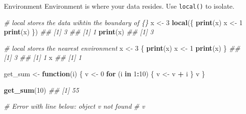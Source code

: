 \documentclass[
  10pt,
  ignorenonframetext,
  serif]{beamer}
\newenvironment{Shaded}{\begin{snugshade}}{\end{snugshade}}
\newcommand{\CommentTok}[1]{\textcolor[rgb]{0.56,0.35,0.01}{\textit{#1}}}
\newcommand{\ControlFlowTok}[1]{\textcolor[rgb]{0.13,0.29,0.53}{\textbf{#1}}}
\newcommand{\DecValTok}[1]{\textcolor[rgb]{0.00,0.00,0.81}{#1}}
\newcommand{\KeywordTok}[1]{\textcolor[rgb]{0.13,0.29,0.53}{\textbf{#1}}}
\newcommand{\NormalTok}[1]{#1}
\newcommand{\OperatorTok}[1]{\textcolor[rgb]{0.81,0.36,0.00}{\textbf{#1}}}
\newcommand{\StringTok}[1]{\textcolor[rgb]{0.31,0.60,0.02}{#1}}
\begin{document}
\begin{frame}[fragile]{Environment}
\protect\hypertarget{environment}{}
Environment is where your data resides. Use \texttt{local()} to isolate.

\begin{Shaded}
\begin{Highlighting}[]
\CommentTok{\# local stores the data wihtin the boundary of \{\}}
\NormalTok{x \textless{}{-}}\StringTok{ }\DecValTok{3}
\KeywordTok{local}\NormalTok{(\{}
  \KeywordTok{print}\NormalTok{(x)}
\NormalTok{  x \textless{}{-}}\StringTok{ }\DecValTok{1}
  \KeywordTok{print}\NormalTok{(x)}
\NormalTok{\})}
\CommentTok{\#\# [1] 3}
\CommentTok{\#\# [1] 1}
\KeywordTok{print}\NormalTok{(x)}
\CommentTok{\#\# [1] 3}
\end{Highlighting}
\end{Shaded}

\begin{Shaded}
\begin{Highlighting}[]
\CommentTok{\# local stores the nearest environment}
\NormalTok{x \textless{}{-}}\StringTok{ }\DecValTok{3}
\NormalTok{\{}
  \KeywordTok{print}\NormalTok{(x)}
\NormalTok{  x \textless{}{-}}\StringTok{ }\DecValTok{1}
  \KeywordTok{print}\NormalTok{(x)}
\NormalTok{\}}
\CommentTok{\#\# [1] 3}
\CommentTok{\#\# [1] 1}
\NormalTok{x}
\CommentTok{\#\# [1] 1}
\end{Highlighting}
\end{Shaded}

\begin{Shaded}
\begin{Highlighting}[]
\NormalTok{get\_sum \textless{}{-}}\StringTok{ }\ControlFlowTok{function}\NormalTok{(i) \{}
\NormalTok{  v \textless{}{-}}\StringTok{ }\DecValTok{0}
  \ControlFlowTok{for}\NormalTok{ (i }\ControlFlowTok{in} \DecValTok{1}\OperatorTok{:}\DecValTok{10}\NormalTok{) \{}
\NormalTok{    v \textless{}{-}}\StringTok{ }\NormalTok{v }\OperatorTok{+}\StringTok{ }\NormalTok{i}
\NormalTok{  \}}
\NormalTok{  v}
\NormalTok{\}}

\KeywordTok{get\_sum}\NormalTok{(}\DecValTok{10}\NormalTok{)}
\CommentTok{\#\# [1] 55}

\CommentTok{\# Error with line below: object \textquotesingle{}v\textquotesingle{} not found}
\CommentTok{\# v}
\end{Highlighting}
\end{Shaded}
\end{frame}
\end{document}
